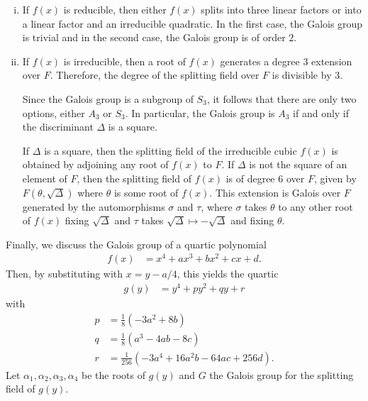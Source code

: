 \documentclass[10pt]{mypackage}
\begin{document}
\begin{enumerate}[(i)]
  \item If $f(x)$ is reducible, then either $f(x)$ splits into three linear factors or into a linear factor and an irreducible quadratic. In the first case, the Galois group is trivial and in the second case, the Galois group is of order $2$.
  \item If $f(x)$ is irreducible, then a root of $f(x)$ generates a degree $3$ extension over $F$. Therefore, the degree of the splitting field over $F$ is divisible by $3$.

    Since the Galois group is a subgroup of $S_3$, it follows that there are only two options, either $A_3$ or $S_3$. In particular, the Galois group is $A_3$ if and only if the discriminant $\Delta$ is a square.

    If $\Delta$ is a square, then the splitting field of the irreducible cubic $f(x)$ is obtained by adjoining any root of $f(x)$ to $F$. If $\Delta$ is not the square of an element of $F$, then the splitting field of $f(x)$ is of degree $6$ over $F$, given by $F\left( \theta,\sqrt{\Delta} \right)$ where $\theta$ is some root of $f(x)$. This extension is Galois over $F$ generated by the automorphisms $\sigma$ and $\tau$, where $\sigma$ takes $\theta$ to any other root of $f(x)$ fixing $\sqrt{\Delta}$ and $\tau$ takes $\sqrt{\Delta}\mapsto -\sqrt{\Delta}$ and fixing $\theta$.
\end{enumerate}
Finally, we discuss the Galois group of a quartic polynomial
\begin{align*}
  f(x) &= x^4 + ax^3 + bx^2 + cx + d.
\end{align*}
Then, by substituting with $x = y - a/4$, this yields the quartic
\begin{align*}
  g(y) &= y^{4} + py^2 + qy + r
\end{align*}
with
\begin{align*}
  p &= \frac{1}{8} \left( -3a^2 + 8b \right)\\
  q &= \frac{1}{8} \left( a^3 - 4ab - 8c \right)\\
  r &= \frac{1}{256} \left( -3a^4 + 16a^2 b - 64ac + 256d \right).
\end{align*}
Let $\alpha_1,\alpha_2,\alpha_3,\alpha_4$ be the roots of $g(y)$ and $G$ the Galois group for the splitting field of $g(y)$.
\end{document}
